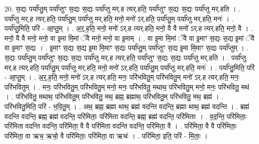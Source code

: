 \documentclass[17pt]{extarticle}
\begin{document}
20. स॒द्यः पर्या᳚प्तु॒म् पर्या᳚प्तुꣳ स॒द्यः स॒द्यः पर्या᳚प्तु मर्.ह त्यर्.हति॒ पर्या᳚प्तुꣳ स॒द्यः स॒द्यः पर्या᳚प्तु मर्.हति । . पर्या᳚प्तु मर्.ह त्यर्.हति॒ पर्या᳚प्तु॒म् पर्या᳚प्तु मर्.हति॒ मनो॒ मनो॑ ऽर्.हति॒ पर्या᳚प्तु॒म् पर्या᳚प्तु मर्.हति॒ मनः॑ । . पर्या᳚प्तु॒मिति॒ परि॑ - आ॒प्तु॒म् । . अ॒र्॒.ह॒ति॒ मनो॒ मनो॑ ऽर्.ह त्यर्.हति॒ मनो॒ वै वै मनो॑ ऽर्.ह त्यर्.हति॒ मनो॒ वै । . मनो॒ वै वै मनो॒ मनो॒ वा इ॒मा मि॒मां ॅवै मनो॒ मनो॒ वा इ॒माम् । . वा इ॒मा मि॒मां ॅवै वा इ॒माꣳ स॒द्यः स॒द्य इ॒मां ॅवै वा इ॒माꣳ स॒द्यः । . इ॒माꣳ स॒द्यः स॒द्य इ॒मा मि॒माꣳ स॒द्यः पर्या᳚प्तु॒म् पर्या᳚प्तुꣳ स॒द्य इ॒मा मि॒माꣳ स॒द्यः पर्या᳚प्तुम् । . स॒द्यः पर्या᳚प्तु॒म् पर्या᳚प्तुꣳ स॒द्यः स॒द्यः पर्या᳚प्तु मर्.ह त्यर्.हति॒ पर्या᳚प्तुꣳ स॒द्यः स॒द्यः पर्या᳚प्तु मर्.हति । . पर्या᳚प्तु मर्.ह त्यर्.हति॒ पर्या᳚प्तु॒म् पर्या᳚प्तु मर्.हति॒ मनो॒ मनो॑ ऽर्.हति॒ पर्या᳚प्तु॒म् पर्या᳚प्तु मर्.हति॒ मनः॑ । . पर्या᳚प्तु॒मिति॒ परि॑ - आ॒प्तु॒म् । . अ॒र्॒.ह॒ति॒ मनो॒ मनो॑ ऽर्.ह त्यर्.हति॒ मनः॒ परि॑भवितु॒म् परि॑भवितु॒म् मनो॑ ऽर्.ह त्यर्.हति॒ मनः॒ परि॑भवितुम् । . मनः॒ परि॑भवितु॒म् परि॑भवितु॒म् मनो॒ मनः॒ परि॑भवितु॒ मथाथ॒ परि॑भवितु॒म् मनो॒ मनः॒ परि॑भवितु॒ मथ॑ । . परि॑भवितु॒ मथाथ॒ परि॑भवितु॒म् परि॑भवितु॒ मथ॒ ब्रह्म॒ ब्रह्माथ॒ परि॑भवितु॒म् परि॑भवितु॒ मथ॒ ब्रह्म॑ । . परि॑भवितु॒मिति॒ परि॑ - भ॒वि॒तु॒म् । . अथ॒ ब्रह्म॒ ब्रह्मा थाथ॒ ब्रह्म॑ वदन्ति वदन्ति॒ ब्रह्मा थाथ॒ ब्रह्म॑ वदन्ति । . ब्रह्म॑ वदन्ति वदन्ति॒ ब्रह्म॒ ब्रह्म॑ वदन्ति॒ परि॑मिताः॒ परि॑मिता वदन्ति॒ ब्रह्म॒ ब्रह्म॑ वदन्ति॒ परि॑मिताः । . व॒द॒न्ति॒ परि॑मिताः॒ परि॑मिता वदन्ति वदन्ति॒ परि॑मिता॒ वै वै परि॑मिता वदन्ति वदन्ति॒ परि॑मिता॒ वै । . परि॑मिता॒ वै वै परि॑मिताः॒ परि॑मिता॒ वा ऋच॒ ऋचो॒ वै परि॑मिताः॒ परि॑मिता॒ वा ऋचः॑ । . परि॑मिता॒ इति॒ परि॑ - मि॒ताः॒ । \newline
\end{document}
